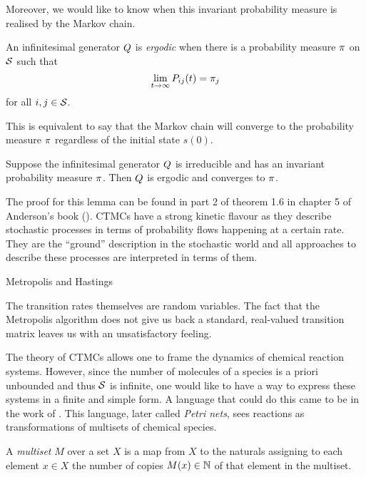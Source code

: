 Moreover, we would like to know when this invariant
probability measure is realised by the Markov chain.

\begin{definition}[ergodicity]
  An infinitesimal generator $Q$ is \emph{ergodic} when
  there is a probability measure $\pi$ on $\mathcal{S}$ such that
  \[ \lim_{t \to \infty} P_{ij}(t) = \pi_j \]
  for all $i,j \in \mathcal{S}$.
\end{definition}

This is equivalent to say that the Markov chain
will converge to the probability measure $\pi$
regardless of the initial state $s(0)$.

\begin{lemma}
  Suppose the infinitesimal generator $Q$ is irreducible
  and has an invariant probability measure $\pi$.
  Then $Q$ is ergodic and converges to $\pi$.
\end{lemma}

The proof for this lemma can be found in part 2 of theorem 1.6
in chapter 5 of Anderson's book (\cite*[][pages 160--161]{anderson}).
CTMCs have a strong kinetic flavour as they describe
stochastic processes in terms of probability flows
happening at a certain rate.
They are the ``ground'' description in the stochastic world
and all approaches to describe these processes
are interpreted in terms of them.



Metropolis and Hastings

The transition rates themselves are random variables.
The fact that the Metropolis algorithm does not give us
back a standard, real-valued transition matrix
leaves us with an unsatisfactory feeling.

The theory of CTMCs allows one to frame
the dynamics of chemical reaction systems.
However, since the number of molecules of a species
is a priori unbounded and thus $\mathcal{S}$ is infinite,
one would like to have a way to express these systems
in a finite and simple form.
A language that could do this
came to be in the work of \citet{petri}.
This language, later called \emph{Petri nets},
sees reactions as transformations of
multisets of chemical species.

\begin{definition}
  A \emph{multiset} $M$ over a set $X$ is a map from $X$ to
  the naturals assigning to each element $x \in X$
  the number of copies $M(x) \in \mathbb{N}$ of that element
  in the multiset.
\end{definition}

